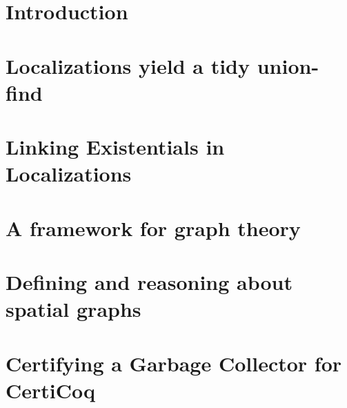 \documentclass[acmsmall,review,anonymous]{acmart}\settopmatter{printfolios=true,printccs=false,printacmref=false}
\begin{document}
\section{Introduction}
\label{sec:intro}



\section{Localizations yield a tidy union-find}
\label{sec:orientation}




%

\section{Linking Existentials in Localizations}
\label{sec:localizations}


\section{A framework for graph theory}
\label{sec:mathgraph}



\section{Defining and reasoning about spatial graphs}
\label{sec:spacegraph}




\section{Certifying a Garbage Collector for CertiCoq}
\label{sec:certigc}



\end{document}
